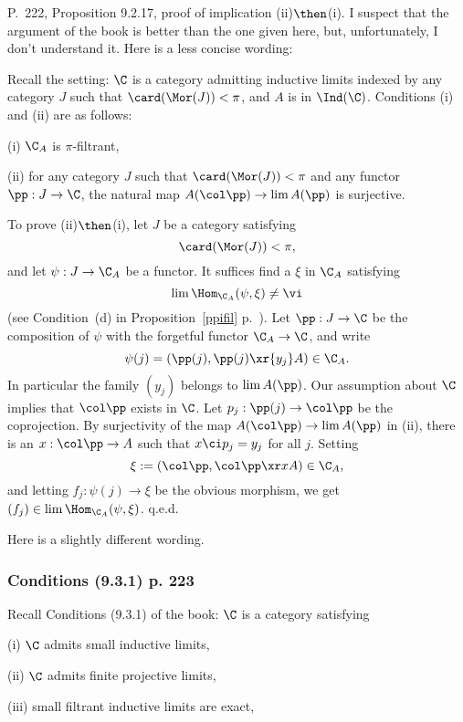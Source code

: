 \documentclass[12pt]{article}
\theoremstyle{remark}
\theoremstyle{definition}
\begin{document}
%

\begin{s} 
P.~222, Proposition 9.2.17, proof of implication (ii)$\then$(i). I suspect that the argument of the book is better than the one given here, but, unfortunately, I don't understand it. Here is a less concise wording:

Recall the setting: $\C$ is a category admitting inductive limits indexed by any category $J$ such that $\card(\Mor(J))<\pi$, and $A$ is in $\Ind(\C)$. Conditions (i) and (ii) are as follows: 

\nn(i) $\C_A$ is $\pi$-filtrant, 

\nn(ii) for any category $J$ such that $\card(\Mor(J))<\pi$ and any functor $\pp:J\to\C$, the natural map $A(\col\pp)\to\lim A(\pp)$ is surjective. 

To prove (ii)$\then$(i), let $J$ be a category satisfying 
$$
\card(\Mor(J))<\pi,
$$ 
and let $\psi:J\to\C_A$ be a functor. It suffices find a $\xi$ in $\C_A$ satisfying 
$$
\lim\Hom_{\C_A}(\psi,\xi)\neq\vi
$$ 
(see Condition~(d) in Proposition~\ref{ppifil} p.~). Let $\pp:J\to\C$ be the composition of $\psi$ with the forgetful functor $\C_A\to\C$, and write 
$$
\psi(j)=\left(\pp(j),\pp(j)\xr{y_j}A\right)\in\C_A.
$$ 
In particular the family $(y_j)$ belongs to $\lim A(\pp)$. Our assumption about $\C$ implies that $\col\pp$ exists in $\C$. Let $p_j:\pp(j)\to\col\pp$ be the coprojection. By surjectivity of the map $A(\col\pp)\to\lim A(\pp)$ in (ii), there is an $x:\col\pp\to A$ such that $x\ci p_j=y_j$ for all $j$. Setting 
$$
\xi:=\left(\col\pp,\col\pp\xr x A\right)\in\C_A,
$$ 
and letting $f_j:\psi(j)\to\xi$ be the obvious morphism, we get $(f_j)\in\lim\Hom_{\C_A}(\psi,\xi)$. q.e.d. 
\end{s}



Here is a slightly different wording. 

\subsubsection{Conditions (9.3.1) p. 223}

Recall Conditions (9.3.1) of the book: $\C$ is a category satisfying  

(i) $\C$ admits small inductive limits,

(ii) $\C$ admits finite projective limits,

(iii) small filtrant inductive limits are exact, 
\end{document}
